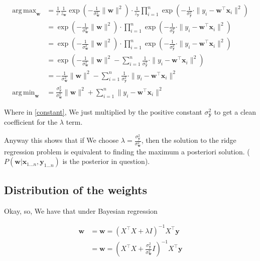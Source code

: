 \documentclass{article}
\DeclareMathOperator*{\argmax}{arg\,max}
\DeclareMathOperator*{\argmin}{arg\,min}
\begin{document}
		\begin{align}
			\argmax_{\mathbf{w}} &= \frac{1}{z'} \frac{1}{z_{\mathbf{w}}}\exp\left(-\frac{1}{\sigma^2_{\mathbf{w}}}\|\mathbf{w}\|^2 \right) \cdot \frac{1}{z_{\mathbf{y}}}\prod^n_{i=1}\exp\left(-\frac{1}{\sigma^2_{\mathbf{y}}}\cdot\|y_i - \mathbf{w}^\top\mathbf{x}_i \|^2\right)\\
			&= \exp\left(-\frac{1}{\sigma^2_{\mathbf{w}}}\|\mathbf{w}\|^2 \right) \cdot \prod^n_{i=1}\exp\left(-\frac{1}{\sigma^2_{\mathbf{y}}}\cdot\|y_i - \mathbf{w}^\top\mathbf{x}_i \|^2\right)\\
			&= \exp\left(-\frac{1}{\sigma^2_{\mathbf{w}}}\|\mathbf{w}\|^2 \right) \cdot \prod^n_{i=1}\exp\left(-\frac{1}{\sigma^2_{\mathbf{y}}}\cdot\|y_i - \mathbf{w}^\top\mathbf{x}_i \|^2\right)\\
			&= \exp\left(-\frac{1}{\sigma^2_{\mathbf{w}}}\|\mathbf{w}\|^2  - \sum^n_{i=1} \frac{1}{\sigma^2_{\mathbf{y}}}\cdot\|y_i - \mathbf{w}^\top\mathbf{x}_i \|^2\right)\\
			&= -\frac{1}{\sigma^2_{\mathbf{w}}}\|\mathbf{w}\|^2  - \sum^n_{i=1} \frac{1}{\sigma^2_{\mathbf{y}}}\cdot\|y_i - \mathbf{w}^\top\mathbf{x}_i \|^2\label{constant}\\
			\argmin_{\mathbf{w}}&= \frac{\sigma^2_{\mathbf{y}}}{\sigma^2_{\mathbf{w}}}\|\mathbf{w}\|^2  + \sum^n_{i=1} \|y_i - \mathbf{w}^\top\mathbf{x}_i \|^2\
		\end{align}
		
		Where in \ref{constant}, We just multiplied by the positive constant $\sigma^2_{\mathbf{y}}$ to get a clean coefficient for the $\lambda$ term.
		
		Anyway this shows that if We choose $\lambda=\frac{\sigma^2_{\mathbf{y}}}{\sigma^2_{\mathbf{w}}}$, then the solution to the ridge regression problem is equivalent to finding the maximum a posteriori solution. ($P(\mathbf{w}|\mathbf{x}_{1\ldots n}, \mathbf{y}_{1\ldots n})$ is the posterior in question).
		
	\subsection{Distribution of the weights}
	
		Okay, so, We have that under Bayesian regression
		
		\begin{align}
			\mathbf{w} &= \mathbf{w} = (X^\top X + \lambda I)^{-1}X^\top \mathbf{y}\\
			&= \mathbf{w} = (X^\top X + \frac{\sigma^2_{\mathbf{y}}}{\sigma^2_{\mathbf{w}}} I)^{-1}X^\top \mathbf{y}\\
		\end{align}
			
\end{document}
